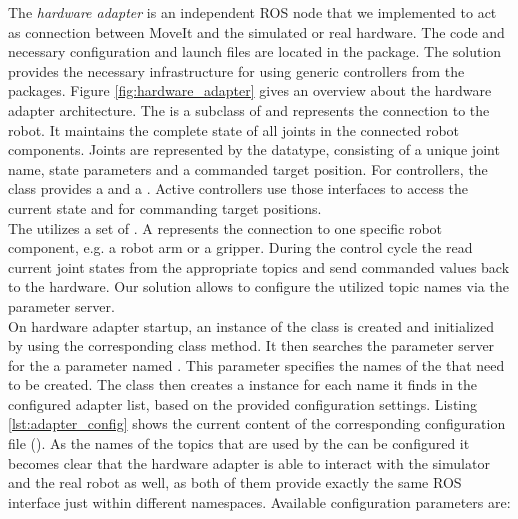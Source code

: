 The \emph{hardware adapter} is an independent ROS node that we implemented to act as connection between MoveIt and the simulated or real hardware. The code and necessary configuration and launch files are located in the  package. The solution provides the necessary infrastructure for using generic controllers from the  packages. Figure \ref{fig:hardware_adapter} gives an overview about the hardware adapter architecture. The  is a subclass of  and represents the connection to the robot. It maintains the complete state of all joints in the connected robot components. Joints are represented by the  datatype, consisting of a unique joint name, state parameters and a commanded target position. For controllers, the  class provides a  and a . Active controllers use those interfaces to access the current state and for commanding target positions. \\ 

The  utilizes a set of . A  represents the connection to one specific robot component, e.g. a robot arm or a gripper. During the control cycle the  read current joint states from the appropriate topics and send commanded values back to the hardware. Our solution allows to configure the utilized topic names via the parameter server.\\

On hardware adapter startup, an instance of the  class is created and initialized by using the corresponding class method. It then searches the parameter server for the a parameter named . This parameter specifies the names of the  that need to be created. The  class then creates a  instance for each name it finds in the configured adapter list, based on the provided configuration settings. Listing \ref{lst:adapter_config} shows the current content of the corresponding configuration file (). As the names of the topics that are used by the  can be configured it becomes clear that the hardware adapter is able to interact with the simulator and the real robot as well, as both of them provide exactly the same ROS interface just within different namespaces. Available configuration parameters are:

